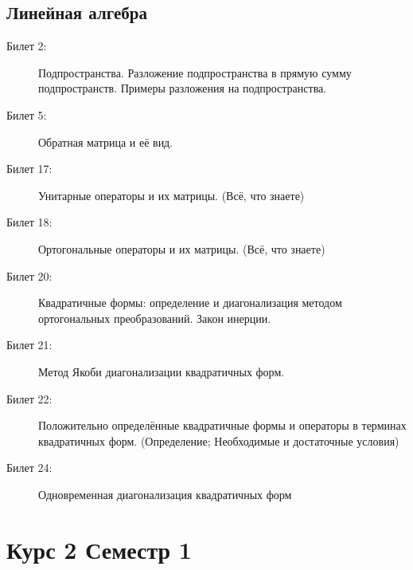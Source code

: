 \documentclass{article}
\begin{document}
\subsection*{Линейная алгебра}
\begin{description}
	\item[Билет 2:]
		Подпространства. Разложение подпространства в прямую сумму
		подпространств. Примеры разложения на подпространства.
	\item[Билет 5:]
		Обратная матрица и её вид.
	\item[Билет 17:]
		Унитарные операторы и их матрицы.
		(Всё, что знаете)
	\item[Билет 18:]
		Ортогональные операторы и их матрицы.
		(Всё, что знаете)
	\item[Билет 20:]
		Квадратичные формы: определение и диагонализация
		методом ортогональных преобразований. Закон инерции.
	\item[Билет 21:]
		Метод Якоби диагонализации квадратичных форм.
	\item[Билет 22:]
		Положительно определённые квадратичные формы
		и операторы в терминах квадратичных форм.
		(Определение; Необходимые и достаточные условия)
	\item[Билет 24:]
		Одновременная диагонализация квадратичных форм
\end{description}
\section*{Курс 2 Семестр 1}
\end{document}
